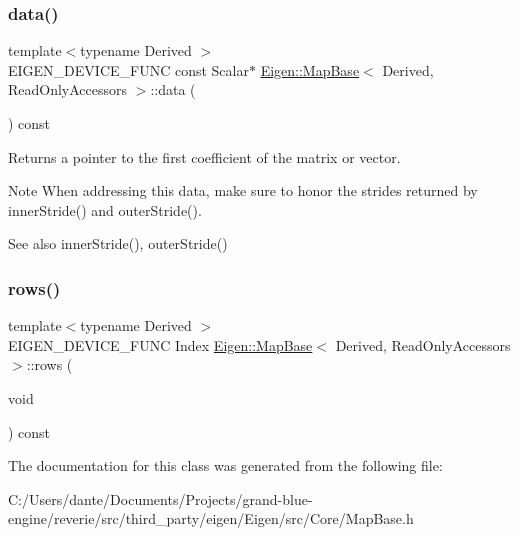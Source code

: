 \subsubsection{\texorpdfstring{data()}{data()}}
{\footnotesize\ttfamily template$<$typename Derived $>$ \\
E\+I\+G\+E\+N\+\_\+\+D\+E\+V\+I\+C\+E\+\_\+\+F\+U\+NC const Scalar$\ast$ \mbox{\hyperlink{class_eigen_1_1_map_base}{Eigen\+::\+Map\+Base}}$<$ Derived, Read\+Only\+Accessors $>$\+::data (\begin{DoxyParamCaption}{ }\end{DoxyParamCaption}) const\hspace{0.3cm}{\ttfamily [inline]}}

Returns a pointer to the first coefficient of the matrix or vector.

\begin{DoxyNote}{Note}
When addressing this data, make sure to honor the strides returned by inner\+Stride() and outer\+Stride().
\end{DoxyNote}
\begin{DoxySeeAlso}{See also}
inner\+Stride(), outer\+Stride() 
\end{DoxySeeAlso}
\mbox{\label{class_eigen_1_1_map_base_3_01_derived_00_01_read_only_accessors_01_4_a78b3ab4983de51f112e6a062ac8f6ffd}} 
\subsubsection{\texorpdfstring{rows()}{rows()}}
{\footnotesize\ttfamily template$<$typename Derived $>$ \\
E\+I\+G\+E\+N\+\_\+\+D\+E\+V\+I\+C\+E\+\_\+\+F\+U\+NC Index \mbox{\hyperlink{class_eigen_1_1_map_base}{Eigen\+::\+Map\+Base}}$<$ Derived, Read\+Only\+Accessors $>$\+::rows (\begin{DoxyParamCaption}\item[{void}]{ }\end{DoxyParamCaption}) const\hspace{0.3cm}{\ttfamily [inline]}}







The documentation for this class was generated from the following file\+:\begin{DoxyCompactItemize}
\item 
C\+:/\+Users/dante/\+Documents/\+Projects/grand-\/blue-\/engine/reverie/src/third\+\_\+party/eigen/\+Eigen/src/\+Core/Map\+Base.\+h\end{DoxyCompactItemize}
